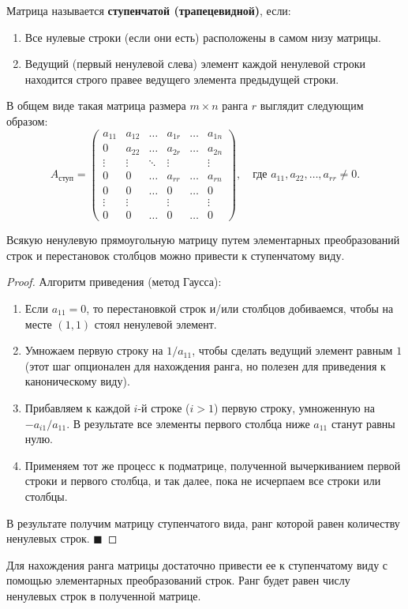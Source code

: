 \begin{definition}
Матрица называется \textbf{ступенчатой (трапецевидной)}, если:
\begin{enumerate}
    \item Все нулевые строки (если они есть) расположены в самом низу матрицы.
    \item Ведущий (первый ненулевой слева) элемент каждой ненулевой строки находится строго правее ведущего элемента предыдущей строки.
\end{enumerate}
В общем виде такая матрица размера $m \times n$ ранга $r$ выглядит следующим образом:
$$
A_{\text{ступ}} = \begin{pmatrix}
a_{11} & a_{12} & \dots & a_{1r} & \dots & a_{1n} \\
0 & a_{22} & \dots & a_{2r} & \dots & a_{2n} \\
\vdots & \vdots & \ddots & \vdots & & \vdots \\
0 & 0 & \dots & a_{rr} & \dots & a_{rn} \\
0 & 0 & \dots & 0 & \dots & 0 \\
\vdots & \vdots & & \vdots & & \vdots \\
0 & 0 & \dots & 0 & \dots & 0
\end{pmatrix}, \quad \text{где } a_{11}, a_{22}, \dots, a_{rr} \neq 0.
$$
\end{definition}

\begin{theorem}
Всякую ненулевую прямоугольную матрицу путем элементарных преобразований строк и перестановок столбцов можно привести к ступенчатому виду.
\end{theorem}

\begin{proof}
Алгоритм приведения (метод Гаусса):
\begin{enumerate}
    \item Если $a_{11} = 0$, то перестановкой строк и/или столбцов добиваемся, чтобы на месте $(1,1)$ стоял ненулевой элемент.
    \item Умножаем первую строку на $1/a_{11}$, чтобы сделать ведущий элемент равным $1$ (этот шаг опционален для нахождения ранга, но полезен для приведения к каноническому виду).
    \item Прибавляем к каждой $i$-й строке ($i > 1$) первую строку, умноженную на $-a_{i1}/a_{11}$. В результате все элементы первого столбца ниже $a_{11}$ станут равны нулю.
    \item Применяем тот же процесс к подматрице, полученной вычеркиванием первой строки и первого столбца, и так далее, пока не исчерпаем все строки или столбцы.
\end{enumerate}
В результате получим матрицу ступенчатого вида, ранг которой равен количеству ненулевых строк.
\hfill$\blacksquare$
\end{proof}

\begin{remark}
Для нахождения ранга матрицы достаточно привести ее к ступенчатому виду с помощью элементарных преобразований строк. Ранг будет равен числу ненулевых строк в полученной матрице.
\end{remark}
